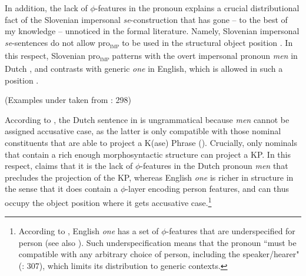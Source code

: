 \documentclass[output=paper,
modfonts,nonflat,
newtxmath
]{langsci/langscibook}
\begin{document}
 In addition, the lack of $\phi$-features in the pronoun explains a crucial distributional fact of the Slovenian impersonal \textit{se}-construction that has gone -- to the best of my knowledge -- unnoticed in the formal literature. Namely, Slovenian impersonal \textit{se}-sentences do not allow pro\textsubscript{\textsc{imp}} to be used in the structural object position . In this respect, Slovenian pro\textsubscript{\textsc{imp}} patterns with the overt impersonal pronoun \textit{men} in Dutch , and  contrasts with  generic \textit{one} in English, which is allowed in such a position . 

\begin{exe} 
 \label{ex:lenardic: 23}
\ex \label{ex:lenardic: 24} \begin{xlist}
\hfill (Examples under   taken from \citealt{Fenger2017}: 298)
\end{xlist}
\end{exe} \par
\par
 
 \noindent According to \citet{Fenger2017}, the Dutch sentence in  is ungrammatical because  \textit{men} cannot be assigned accusative case, as the latter is  only compatible with those nominal constituents that are able to project a K(ase) Phrase (\citealt{bayer2001}). Crucially, only nominals that contain a rich enough morphosyntactic structure can project a KP. In this respect, \citet{Fenger2017} claims that it is the lack of $\phi$-features in the Dutch pronoun \textit{men}  that precludes the projection of the KP, whereas English \textit{one} is richer in structure in the sense that it does contain a $\phi$-layer encoding person features, and can thus occupy the  object position where it gets accusative case.\footnote{According to \citet{Fenger2017}, English \textit{one} has a set of $\phi$-features that are underspecified for person (see also \citealt{ackema2018}). Such underspecification means that the pronoun ``must be compatible with any arbitrary choice of person, including the speaker/hearer" (\citealt{Fenger2017}: 307), which limits its distribution to generic contexts.}\par
 
\end{document}
